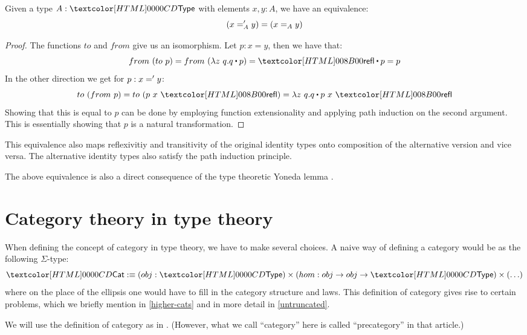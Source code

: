 \begin{proposition}
  Given a type $A : \Type$ with elements $x, y : A$, we have an equivalence:
  $$
  (x ='_{A} y) = (x =_{A} y)
  $$
\end{proposition}

\begin{proof}
  The functions $to$ and $from$ give us an isomorphism. Let $p : x = y$, then we have that:
  $$
  from\ (to\ p) = from\ (\lambda z\ q . \trans{q}{p}) = \trans{\refl}{p} = p
  $$
  In the other direction we get for $p : x =' y$:
  $$
  to\ (from\ p) = to\ (p\ x\ \refl) = \lambda z\ q . \trans{q}{p\ x\ \refl}
  $$
  Showing that this is equal to $p$ can be done by employing function
  extensionality and applying path induction on the second
  argument. This is essentially showing that $p$ is a natural
  transformation.
\end{proof}

This equivalence also maps reflexivitiy and transitivity of the
original identity types onto composition of the alternative version
and vice versa. The alternative identity types also satisfy the path
induction principle.

The above equivalence is also a direct consequence of the type
theoretic Yoneda lemma \cite{Rijke2012}.

\section{Category theory in type theory}

When defining the concept of category in type theory, we have to make
several choices. A naive way of defining a category would be as the
following $\Sigma$-type:
$$
\Cat \ddefeq (obj : \Type) \times (hom : obj \to obj \to \Type) \times (\hdots)
$$
where on the place of the ellipsis one would have to fill in the
category structure and laws. This definition of category gives rise to
certain problems, which we briefly mention in \cref{higher-cats} and
in more detail in \cref{untruncated}.

We will use the definition of category as in
\cite{Ahrens2015}. (However, what we call ``category'' here is called
``precategory'' in that article.)

